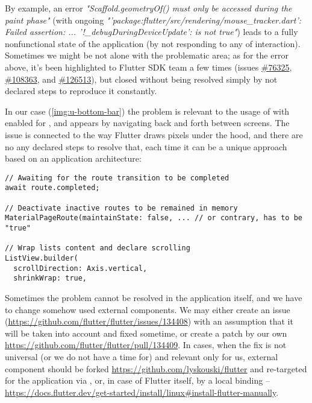 By example, an error \emph{"Scaffold.geometryOf() must only be accessed during the paint phase"} (with ongoing 
\emph{"'package:flutter/src/rendering/mouse\_tracker.dart': Failed assertion: ... '!\_debugDuringDeviceUpdate': 
is not true"}) leads to a fully nonfunctional state  of the application (by not responding to any of interaction).
Sometimes we might be not alone with the problematic area; as for the error above, it's been highlighted to Flutter 
SDK team a few times (issues \href{https://github.com/flutter/flutter/issues/76325}{\#76325},
\href{https://github.com/flutter/flutter/issues/108363}{\#108363}, and
\href{https://github.com/flutter/flutter/issues/126513}{\#126513}), but closed without being resolved simply by not 
declared steps to reproduce it constantly.


In our case (\cref{img:u-bottom-bar}) the problem is relevant to the usage of  with enabled  for , and appears by 
navigating back and forth between screens. The issue is connected to the way Flutter draws pixels under the hood, and 
there are no any declared steps to resolve that, each time it can be a unique approach based on an application 
architecture:

\begin{lstlisting}
// Awaiting for the route transition to be completed
await route.completed;

// Deactivate inactive routes to be remained in memory
MaterialPageRoute(maintainState: false, ... // or contrary, has to be "true"

// Wrap lists content and declare scrolling
ListView.builder(
  scrollDirection: Axis.vertical,
  shrinkWrap: true,
\end{lstlisting}

Sometimes the problem cannot be resolved in the application itself, and we have to change somehow used external 
components. We may either create an issue 
(\href{https://github.com/flutter/flutter/issues/134408}{https://github.com/flutter/flutter/issues/134408}) 
with an assumption that it will be taken into account and fixed sometime, or create a patch by our own 
\href{https://github.com/flutter/flutter/pull/134409}{https://github.com/flutter/flutter/pull/134409}. In cases, when 
the fix is not universal (or we do not have a time for) and relevant only for us, external component should be forked 
\href{https://github.com/lyskouski/flutter}{https://github.com/lyskouski/flutter} and re-targeted for the application
via , or, in case of Flutter itself, by a local binding -- 
\href{https://docs.flutter.dev/get-started/install/linux#install-flutter-manually}{https://docs.flutter.dev/get-started/install/linux\#install-flutter-manually}.
